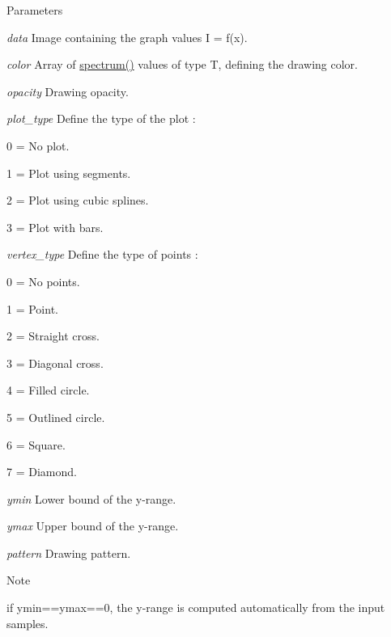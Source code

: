 \begin{DoxyParams}{Parameters}
\item[{\em data}]Image containing the graph values I = f(x). \item[{\em color}]Array of \hyperlink{structcimg__library_1_1CImg_acd2ee207fa512e34b45ff548082f70ba}{spectrum()} values of type {\ttfamily T}, defining the drawing color. \item[{\em opacity}]Drawing opacity.\item[{\em plot\_\-type}]Define the type of the plot :
\begin{DoxyItemize}
\item 0 = No plot.
\item 1 = Plot using segments.
\item 2 = Plot using cubic splines.
\item 3 = Plot with bars. 
\end{DoxyItemize}\item[{\em vertex\_\-type}]Define the type of points :
\begin{DoxyItemize}
\item 0 = No points.
\item 1 = Point.
\item 2 = Straight cross.
\item 3 = Diagonal cross.
\item 4 = Filled circle.
\item 5 = Outlined circle.
\item 6 = Square.
\item 7 = Diamond. 
\end{DoxyItemize}\item[{\em ymin}]Lower bound of the y-\/range. \item[{\em ymax}]Upper bound of the y-\/range. \item[{\em pattern}]Drawing pattern. \end{DoxyParams}
\begin{DoxyNote}{Note}

\begin{DoxyItemize}
\item if {\ttfamily ymin==ymax==0}, the y-\/range is computed automatically from the input samples. 
\end{DoxyItemize}
\end{DoxyNote}
